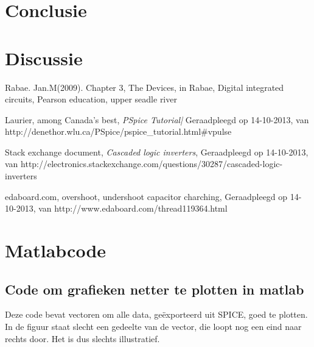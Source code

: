 \documentclass{report}
\begin{document}
\chapter{Conclusie}


\chapter {Discussie}
%

\begin{thebibliography}{La}
%
Rabae. Jan.M(2009). Chapter 3, The Devices, in Rabae, Digital integrated circuits, Pearson education, upper seadle river

Laurier, among Canada's best, \textit{PSpice Tutorial|} Geraadpleegd op 14-10-2013, van http://denethor.wlu.ca/PSpice/pspice\_tutorial.html\#vpulse

Stack exchange document, \textit{Cascaded logic inverters}, Geraadpleegd op 14-10-2013, van http://electronics.stackexchange.com/questions/30287/cascaded-logic-inverters

edaboard.com, overshoot, undershoot capacitor charching, Geraadpleegd op 14-10-2013, van http://www.edaboard.com/thread119364.html

 
\end{thebibliography}

\appendix
\chapter{Matlabcode}
\label{Aa}
\section{Code om grafieken netter te plotten in matlab}
\label{A1}
\tiny
{}
\normalsize
Deze code bevat vectoren om alle data, geëxporteerd uit SPICE, goed te plotten. In de figuur staat slecht een gedeelte van de vector, die loopt nog een eind naar rechts door. Het is dus slechts illustratief. 
\end{document}
